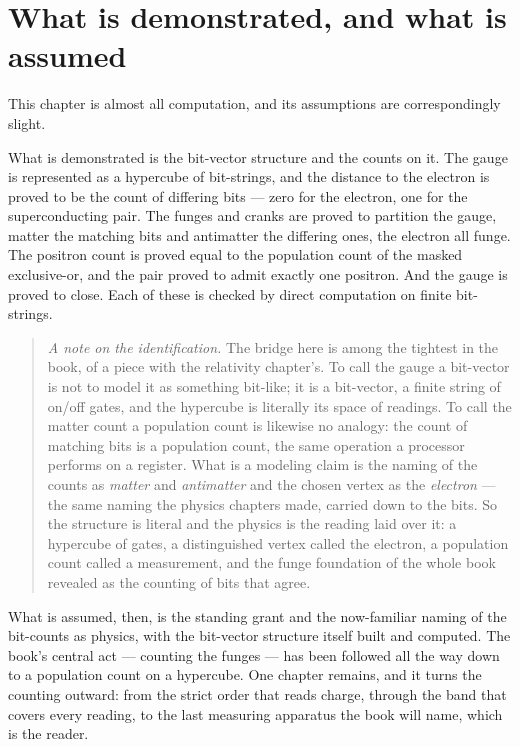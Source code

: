 \section{What is demonstrated, and what is assumed}
\label{se:demonstrated-assumed-ch31}

This chapter is almost all computation, and its assumptions are correspondingly slight.

What is demonstrated is the bit-vector structure and the counts on it. The gauge is represented as a
hypercube of bit-strings, and the distance to the electron is proved to be the count of differing bits ---
zero for the electron, one for the superconducting pair. The funges and cranks are proved to partition
the gauge, matter the matching bits and antimatter the differing ones, the electron all funge. The
positron count is proved equal to the population count of the masked exclusive-or, and the pair proved to
admit exactly one positron. And the gauge is proved to close. Each of these is checked by direct
computation on finite bit-strings.

\begin{quote}
\emph{A note on the identification.} The bridge here is among the tightest in the book, of a piece with
the relativity chapter's. To call the gauge a bit-vector is not to model it as something bit-like; it is a
bit-vector, a finite string of on/off gates, and the hypercube is literally its space of readings. To
call the matter count a population count is likewise no analogy: the count of matching bits is a
population count, the same operation a processor performs on a register. What is a modeling claim is the
naming of the counts as \emph{matter} and \emph{antimatter} and the chosen vertex as the \emph{electron}
--- the same naming the physics chapters made, carried down to the bits. So the structure is literal and
the physics is the reading laid over it: a hypercube of gates, a distinguished vertex called the electron,
a population count called a measurement, and the funge foundation of the whole book revealed as the
counting of bits that agree.
\end{quote}

What is assumed, then, is the standing grant and the now-familiar naming of the bit-counts as physics,
with the bit-vector structure itself built and computed. The book's central act --- counting the funges
--- has been followed all the way down to a population count on a hypercube. One chapter remains, and it
turns the counting outward: from the strict order that reads charge, through the band that covers every
reading, to the last measuring apparatus the book will name, which is the reader.
